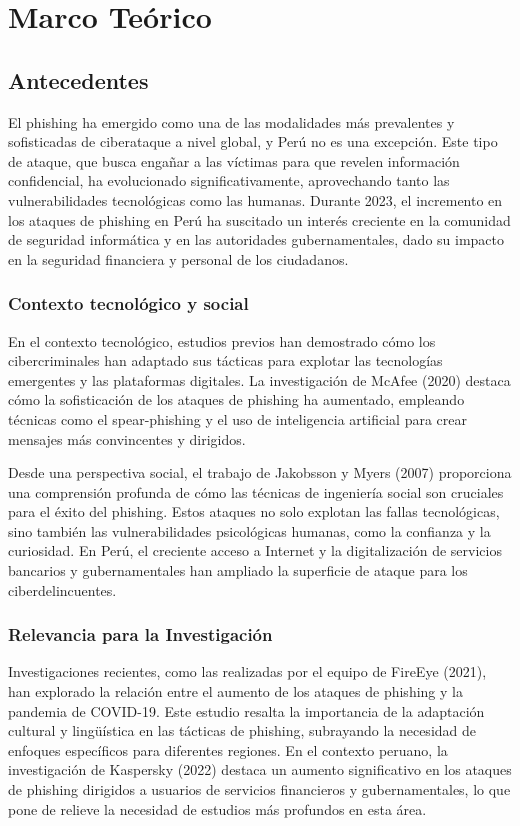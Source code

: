 \chapter{Marco Teórico}

\section{Antecedentes}
El phishing ha emergido como una de las modalidades más prevalentes y sofisticadas de ciberataque a nivel global, y Perú no es una excepción. Este tipo de ataque, que busca engañar a las víctimas para que revelen información confidencial, ha evolucionado significativamente, aprovechando tanto las vulnerabilidades tecnológicas como las humanas. Durante 2023, el incremento en los ataques de phishing en Perú ha suscitado un interés creciente en la comunidad de seguridad informática y en las autoridades gubernamentales, dado su impacto en la seguridad financiera y personal de los ciudadanos.

\subsection{Contexto tecnológico y social}
En el contexto tecnológico, estudios previos han demostrado cómo los cibercriminales han adaptado sus tácticas para explotar las tecnologías emergentes y las plataformas digitales. La investigación de McAfee (2020) destaca cómo la sofisticación de los ataques de phishing ha aumentado, empleando técnicas como el spear-phishing y el uso de inteligencia artificial para crear mensajes más convincentes y dirigidos.

Desde una perspectiva social, el trabajo de Jakobsson y Myers (2007) proporciona una comprensión profunda de cómo las técnicas de ingeniería social son cruciales para el éxito del phishing. Estos ataques no solo explotan las fallas tecnológicas, sino también las vulnerabilidades psicológicas humanas, como la confianza y la curiosidad. En Perú, el creciente acceso a Internet y la digitalización de servicios bancarios y gubernamentales han ampliado la superficie de ataque para los ciberdelincuentes.

\subsection{Relevancia para la Investigación}
Investigaciones recientes, como las realizadas por el equipo de FireEye (2021), han explorado la relación entre el aumento de los ataques de phishing y la pandemia de COVID-19. Este estudio resalta la importancia de la adaptación cultural y lingüística en las tácticas de phishing, subrayando la necesidad de enfoques específicos para diferentes regiones. En el contexto peruano, la investigación de Kaspersky (2022) destaca un aumento significativo en los ataques de phishing dirigidos a usuarios de servicios financieros y gubernamentales, lo que pone de relieve la necesidad de estudios más profundos en esta área.

